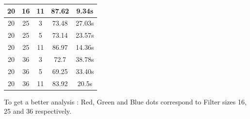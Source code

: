 \documentclass{article} %
\begin{document}
\begin{table}[H]
\begin{center}
\begin{tabular}{| c | c | c | c | c |}
      \hline
      20 & 16 & 11 & 87.62 & 9.34s\\
      \hline
      20 & 25 & 3 & 73.48 & 27.03s\\
      \hline
      20 & 25 & 5 & 73.14 & 23.57s\\
      \hline
      20 & 25 & 11 & 86.97 & 14.36s\\
      \hline
      20 & 36 & 3 & 72.7 & 38.78s\\
      \hline
      20 & 36 & 5 & 69.25 & 33.40s\\
      \hline
      20 & 36 & 11 & 83.92 & 20.5s \\
      \hline
    \end{tabular}
  \end{center}
\end{table}

To get a better analysis : Red, Green and Blue dots correspond to Filter sizes 16, 25 and 36 respectively.
\end{document}
